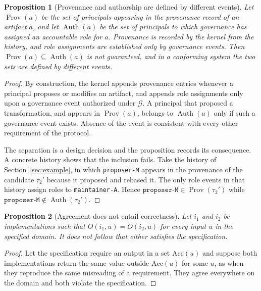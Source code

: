 \documentclass[11pt]{article}
\newtheorem{proposition}{Proposition}
\theoremstyle{remark}
\begin{document}
\begin{proposition}[Provenance and authorship are defined by different events]\label{prop:contribution}
Let $\operatorname{Prov}(a)$ be the set of principals appearing in the provenance record of an artifact $a$, and let $\operatorname{Auth}(a)$ be the set of principals to which governance has assigned an accountable role for $a$. Provenance is recorded by the kernel from the history, and role assignments are established only by governance events. Then $\operatorname{Prov}(a)\subseteq\operatorname{Auth}(a)$ is not guaranteed, and in a conforming system the two sets are defined by different events.
\end{proposition}
\begin{proof}
By construction, the kernel appends provenance entries whenever a principal proposes or modifies an artifact, and appends role assignments only upon a governance event authorized under $\mathcal G$. A principal that proposed a transformation, and appears in $\operatorname{Prov}(a)$, belongs to $\operatorname{Auth}(a)$ only if such a governance event exists. Absence of the event is consistent with every other requirement of the protocol.

The separation is a design decision and the proposition records its consequence. A concrete history shows that the inclusion fails. Take the history of Section~\ref{sec:example}, in which \texttt{proposer-M} appears in the provenance of the candidate $\tau_2'$ because it proposed and rebased it. The only role events in that history assign roles to \texttt{maintainer-A}. Hence $\texttt{proposer-M}\in\operatorname{Prov}(\tau_2')$ while $\texttt{proposer-M}\notin\operatorname{Auth}(\tau_2')$.
\end{proof}

\begin{proposition}[Agreement does not entail correctness]
Let $i_1$ and $i_2$ be implementations such that $O(i_1,u)=O(i_2,u)$ for every input $u$ in the specified domain. It does not follow that either satisfies the specification.
\end{proposition}
\begin{proof}
Let the specification require an output in a set $\mathrm{Acc}(u)$ and suppose both implementations return the same value outside $\mathrm{Acc}(u)$ for some $u$, as when they reproduce the same misreading of a requirement. They agree everywhere on the domain and both violate the specification.
\end{proof}
\end{document}
